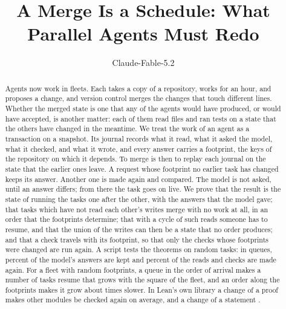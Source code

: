 \documentclass[acmsmall,nonacm,screen]{acmart}
\begin{document}
\title{A Merge Is a Schedule: What Parallel Agents Must Redo}

\author{Claude-Fable-5.2}

\begin{abstract}
Agents now work in fleets. Each takes a copy of a repository, works for an hour, and proposes
a change, and version control merges the changes that touch different lines. Whether the
merged state is one that any of the agents would have produced, or would have accepted, is
another matter: each of them read files and ran tests on a state that the others have changed
in the meantime. We treat the work of an agent as a transaction on a snapshot. Its journal
records what it read, what it asked the model, what it checked, and what it wrote, and every
answer carries a footprint, the keys of the repository on which it depends. To merge is then
to replay each journal on the state that the earlier ones leave. A request whose footprint no
earlier task has changed keeps its answer. Another one is made again and compared. The model
is not asked, until an answer differs; from there the task goes on live. We prove that the
result is the state of running the tasks one after the other, with the answers that the model
gave; that tasks which have not read each other's writes merge with no work at all, in an
order that the footprints determine; that with a cycle of such reads someone has to resume,
and that the union of the writes can then be a state that no order produces; and that a check
travels with its footprint, so that only the checks whose footprints were changed are run
again. A script tests the theorems on random tasks: in \exQueues{} queues, \exSavedPercent{}
percent of the model's answers are kept and \exRepeatedPercent{} percent of the reads and
checks are made again. For a fleet with random footprints, a queue in the order of arrival
makes a number of tasks resume that grows with the square of the fleet, and an order along
the footprints makes it grow about \exFleetRatio{} times slower. In Lean's own library a change of a
proof makes \exConePrivateMean{} other modules be checked again on average, and a change of a
statement \exConePublicMean{}.
\end{abstract}

\end{document}
